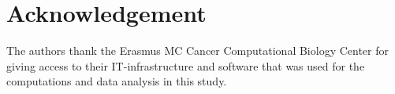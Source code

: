 \section*{Acknowledgement}
The authors thank the Erasmus MC Cancer Computational Biology Center for giving access to their IT-infrastructure and software that was used for the computations and data analysis in this study.